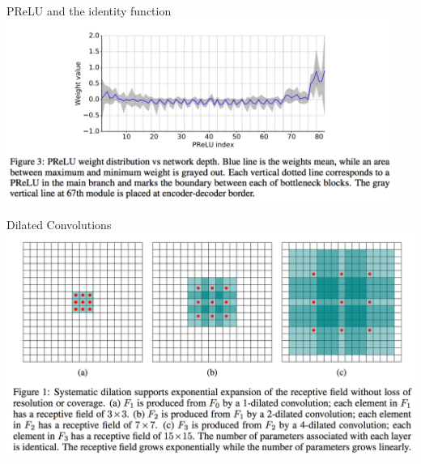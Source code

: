 \documentclass[]{beamer}
\begin{document}

\begin{frame}{PReLU and the identity function}
\centering
\includegraphics[width=0.95\textwidth]{figures/enet-prelu}
\end{frame}

\begin{frame}{Dilated Convolutions}
\centering
\includegraphics[scale=0.325]{figures/dilated-convolutions}
\end{frame}

\end{document}
